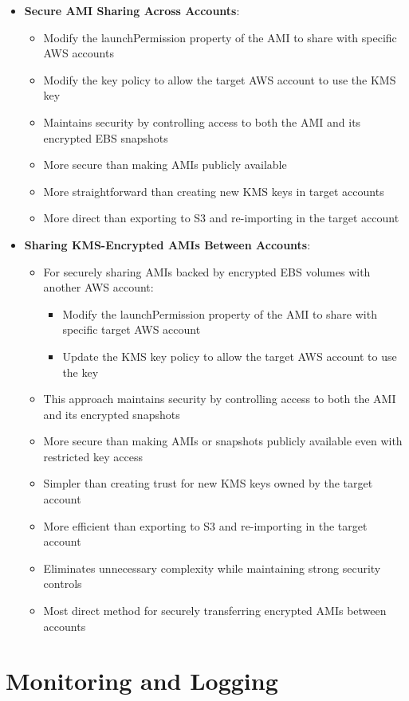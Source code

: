 \documentclass[11pt,a4paper]{report}
\begin{document}
\begin{itemize}
  \item \textbf{Secure AMI Sharing Across Accounts}:
\begin{itemize}
  \item Modify the launchPermission property of the AMI to share with specific AWS accounts
  \item Modify the key policy to allow the target AWS account to use the KMS key
  \item Maintains security by controlling access to both the AMI and its encrypted EBS snapshots
  \item More secure than making AMIs publicly available
  \item More straightforward than creating new KMS keys in target accounts
  \item More direct than exporting to S3 and re-importing in the target account
\end{itemize}
  \item \textbf{Sharing KMS-Encrypted AMIs Between Accounts}:
\begin{itemize}
  \item For securely sharing AMIs backed by encrypted EBS volumes with another AWS account:
\begin{itemize}
  \item Modify the launchPermission property of the AMI to share with specific target AWS account
  \item Update the KMS key policy to allow the target AWS account to use the key
\end{itemize}
  \item This approach maintains security by controlling access to both the AMI and its encrypted snapshots
  \item More secure than making AMIs or snapshots publicly available even with restricted key access
  \item Simpler than creating trust for new KMS keys owned by the target account
  \item More efficient than exporting to S3 and re-importing in the target account
  \item Eliminates unnecessary complexity while maintaining strong security controls
  \item Most direct method for securely transferring encrypted AMIs between accounts
\end{itemize}
\end{itemize}


\chapter{Monitoring and Logging}
\end{document}
